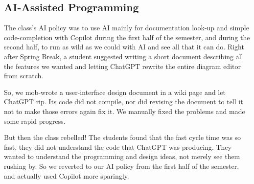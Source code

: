 \documentclass{article}
\begin{document}
\subsection{AI-Assisted Programming}

The class's AI policy was to use AI mainly for documentation look-up and simple
code-completion with Copilot during the first half of the semester, and during
the second half, to run as wild as we could with AI and see all that it can do.
Right after Spring Break, a student suggested writing a short document
describing all the features we wanted and letting ChatGPT rewrite the entire
diagram editor from scratch.

So, we mob-wrote a user-interface design document in a wiki page and let
ChatGPT rip. Its code did not compile, nor did revising the document to tell
it not to make those errors again fix it.  We manually fixed the problems and
made some rapid progress.

But then the class rebelled! The students found that the fast cycle time was
so fast, they did not understand the code that ChatGPT was producing. They
wanted to understand the programming and design ideas, not merely see them
rushing by. So we reverted to our AI policy from the first half of the
semester, and actually used Copilot more sparingly.

\begin{comment}
\subsection{Other Problems and Solutions}

Here are a few other problems that emerged and the solutions we chose.

\emph{Problem:} The term ``software design'' is highly ambiguous.
Different experts hold radically different conceptions, from
Jack Reeves' view that ``the source code is the
design'' \cite{reeves1992software} to IEEE~1016--2009, which specifies
12~``design viewpoints'', each with its own design entities, design
relationships, and design attributes, to be described in a design language
such as UML \cite{IEEE1016-2009}. The number of aspects or elements of software
design is mind-boggling, and each comes with its own opinionated camps and
controversies: high-level design, low-level design, system design, interface
design (which can mean user-interface design, interaction design,
communication protocols, or class method signatures, depending on who's
talking), database design, architectural design, GoF design patterns, ways of
organizing source code into subroutines, and more. How can one course cover so
many topics, and steer between the Scylla and Charybdis of pushing a
controversial position on the students and letting students wander without
guidance into completely uninformed opinions?

\emph{Solution:} The first readings were on three radically different
conceptions of design, one by Dave Parnas, one by Alan Cooper, and the above
article by Jack Reeves.
\end{comment}
\end{document}
